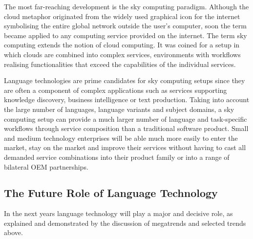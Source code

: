 \documentclass[10pt, plain]{../../metanetpaper}
\begin{document}
\begin{multicols}{2}
The most far-reaching development is the sky computing paradigm. Although the cloud metaphor originated from the widely used graphical icon for the internet symbolising the entire global network outside the user’s computer, soon the term became applied to any computing service provided on the internet. The term sky computing extends the notion of cloud computing. It was coined for a setup in which clouds are combined into complex services, environments with workflows realising functionalities that exceed the capabilities of the individual services. 

Language technologies are prime candidates for sky computing setups since they are often a component of complex applications such as services supporting knowledge discovery, business intelligence or text production. Taking into account the large number of languages, language variants and subject domains, a sky computing setup can provide a much larger number of language and task-specific workflows through service composition than a traditional software product. Small and medium technology enterprises will be able much more easily to enter the market, stay on the market and improve their services without having to cast all demanded service combinations into their product family or into a range of bilateral OEM partnerships.

\subsection[The Future Role of Language Technology]{The Future Role of Language Technology}
\label{sec:}


In the next years language technology will play a major and decisive role, as explained and demonstrated by the discussion of megatrends and selected trends above. 
\pagebreak


\end{multicols}
\end{document}
